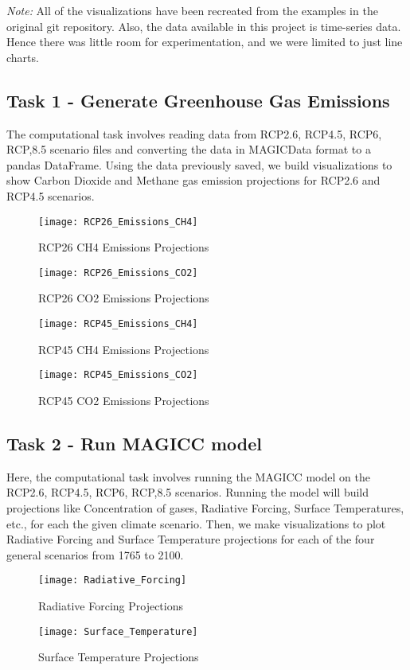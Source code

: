 \documentclass{article}
\begin{document}
\textit{Note:} All of the visualizations have been recreated from the examples in the
original git repository. Also, the data available in this project is time-series data.
Hence there was little room for experimentation, and we were limited to just line charts.

\subsection{Task 1 - Generate Greenhouse Gas Emissions}
The computational task involves reading data from RCP2.6, RCP4.5, RCP6, RCP,8.5 scenario files
and converting the data in MAGICData format to a pandas DataFrame. Using the data previously saved, we
build visualizations to show Carbon Dioxide and Methane gas emission projections for RCP2.6 and RCP4.5 scenarios.

\begin{figure}[ht]
    \texttt{[image: RCP26\_Emissions\_CH4]}
    \caption{RCP26 CH4 Emissions Projections}
\end{figure}

\begin{figure}
    \texttt{[image: RCP26\_Emissions\_CO2]}
    \caption{RCP26 CO2 Emissions Projections}
\end{figure}

\begin{figure}
    \texttt{[image: RCP45\_Emissions\_CH4]}
    \caption{RCP45 CH4 Emissions Projections}
\end{figure}

\begin{figure}
    \texttt{[image: RCP45\_Emissions\_CO2]}
    \caption{RCP45 CO2 Emissions Projections}
\end{figure}

\clearpage
\subsection{Task 2 - Run MAGICC model}
Here, the computational task involves running the MAGICC model on the RCP2.6, RCP4.5, RCP6, RCP,8.5
scenarios. Running the model will build projections like Concentration of gases, Radiative Forcing,
Surface Temperatures, etc., for each the given climate scenario. Then, we make visualizations to plot
Radiative Forcing and Surface Temperature projections for each of the four general scenarios from 1765 to 2100.

\begin{figure}[H]
\texttt{[image: Radiative\_Forcing]}
\caption{Radiative Forcing Projections}
\end{figure}

\begin{figure}[H]
\texttt{[image: Surface\_Temperature]}
\caption{Surface Temperature Projections}
\end{figure}
    



\end{document}
